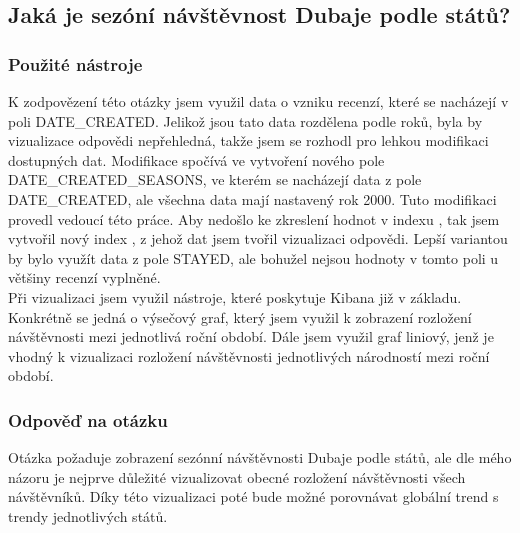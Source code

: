 \documentclass[czech,BP]{thesiskiv}
\begin{document}
\subsection{Jaká je sezóní návštěvnost Dubaje podle států?}
\subsubsection{Použité nástroje}
K zodpovězení této otázky jsem využil data o vzniku recenzí, které se nacházejí v poli DATE\_CREATED. Jelikož jsou tato data rozdělena podle roků, byla by vizualizace odpovědi nepřehledná, takže jsem se rozhodl pro lehkou modifikaci dostupných dat. Modifikace spočívá ve vytvoření nového pole DATE\_CREATED\_SEASONS, ve kterém se nacházejí data z pole DATE\_CREATED, ale všechna data mají nastavený rok 2000. Tuto modifikaci provedl vedoucí této práce. Aby nedošlo ke zkreslení hodnot v indexu , tak jsem vytvořil nový index , z jehož dat jsem tvořil vizualizaci odpovědi. Lepší variantou by bylo využít data z pole STAYED, ale bohužel nejsou hodnoty v tomto poli u většiny recenzí vyplněné.
\\
Při vizualizaci jsem využil nástroje, které poskytuje Kibana již v základu. Konkrétně se jedná o výsečový graf, který jsem využil k zobrazení rozložení návštěvnosti mezi jednotlivá roční období. Dále jsem využil graf liniový, jenž je vhodný k vizualizaci rozložení návštěvnosti jednotlivých národností mezi roční období.

\subsubsection{Odpověď na otázku}
Otázka požaduje zobrazení sezónní návštěvnosti Dubaje podle států, ale dle mého názoru je nejprve důležité vizualizovat obecné rozložení návštěvnosti všech návštěvníků. Díky této vizualizaci poté bude možné porovnávat globální trend s trendy jednotlivých států.
\vspace{2cm}
\end{document}
